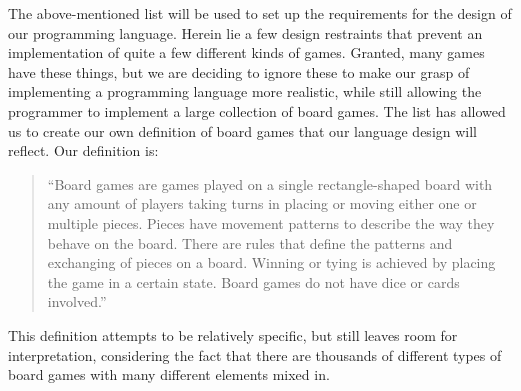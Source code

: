 The above-mentioned list will be used to set up the requirements for the design of our programming language. 
Herein lie a few design restraints that prevent an implementation of quite a few different kinds of games. 
Granted, many games have these things, but we are deciding to ignore these to make our grasp of implementing a programming language more realistic, while still allowing the programmer to implement a large collection of board games. The list has allowed us to create our own definition of board games that our language design will reflect. Our definition is:

\begin{quote}
``Board games are games played on a single rectangle-shaped board with any amount of players taking turns in placing or moving either one or multiple pieces. Pieces have movement patterns to describe the way they behave on the board. There are rules that define the patterns and exchanging of pieces on a board. Winning or tying is achieved by placing the game in a certain state. Board games do not have dice or cards involved.''
\end{quote}

This definition attempts to be relatively specific, but still leaves room for interpretation, considering the fact that there are thousands of different types of board games with many different elements mixed in.
